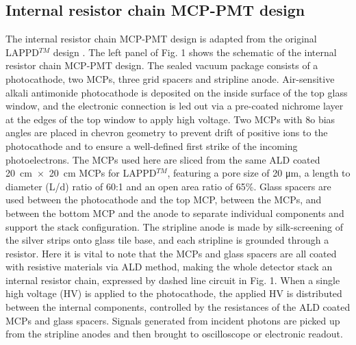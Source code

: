 \documentclass[preprint,5p]{elsarticle}
\begin{document}
\subsection{Internal resistor chain MCP-PMT design} \label{}
The internal resistor chain MCP-PMT design is adapted from the original LAPPD$^{TM}$ 
design \cite{17}. The left panel of Fig. 1 shows the schematic of the internal 
resistor chain MCP-PMT design. The sealed vacuum package consists of a 
photocathode, two MCPs, three grid spacers and stripline anode. Air-sensitive 
alkali antimonide photocathode is deposited on the inside surface of the top 
glass window, and the electronic connection is led out via a pre-coated 
nichrome layer at the edges of the top window to apply high voltage. Two MCPs 
with 8o bias angles are placed in chevron geometry to prevent drift of positive 
ions to the photocathode and to ensure a well-defined first strike of the 
incoming photoelectrons. The MCPs used here are sliced from the same ALD coated 
20~cm~$\times$~20~cm MCPs for LAPPD$^{TM}$, featuring a pore size of 20 μm, a 
length to diameter (L/d) ratio of 60:1 and an open area ratio of 65\%.  Glass 
spacers are used between the photocathode and the top MCP, between the MCPs, 
and between the bottom MCP and the anode to separate individual components and 
support the stack configuration. The stripline anode is made by silk-screening 
of the silver strips onto glass tile base, and each stripline is grounded 
through a resistor. Here it is vital to note that the MCPs and glass spacers 
are all coated with resistive materials via ALD method, making the whole 
detector stack an internal resistor chain, expressed by dashed line circuit in 
Fig. 1. When a single high voltage (HV) is applied to the photocathode, the 
applied HV is distributed between the internal components, controlled by the 
resistances of the ALD coated MCPs and glass spacers. Signals generated from 
incident photons are picked up from the stripline anodes and then brought to 
oscilloscope or electronic readout. 
\end{document}
